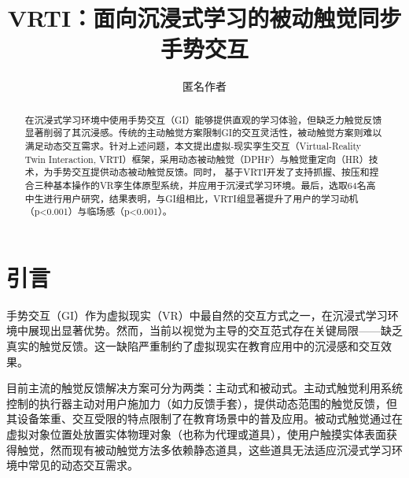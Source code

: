 \documentclass[runningheads]{llncs}
\begin{document}
\title{VRTI：面向沉浸式学习的被动触觉同步手势交互}

 


\author{匿名作者}

\maketitle


\begin{abstract}
在沉浸式学习环境中使用手势交互（GI）能够提供直观的学习体验，但缺乏力触觉反馈显著削弱了其沉浸感。传统的主动触觉方案限制GI的交互灵活性，被动触觉方案则难以满足动态交互需求。针对上述问题，本文提出虚拟-现实孪生交互（Virtual-Reality Twin Interaction, VRTI）框架，采用动态被动触觉（DPHF）与触觉重定向（HR）技术，为手势交互提供动态被动触觉反馈。同时，
基于VRTI开发了支持抓握、按压和捏合三种基本操作的VR孪生体原型系统，并应用于沉浸式学习环境。最后，选取64名高中生进行用户研究，结果表明，与GI组相比，VRTI组显著提升了用户的学习动机（p<0.001）与临场感（p<0.001）。

\end{abstract}

\section{引言}
手势交互（GI）作为虚拟现实（VR）中最自然的交互方式之一，在沉浸式学习环境中展现出显著优势\cite{fang2024interactive,amaral2024interactive}。然而，当前以视觉为主导的交互范式存在关键局限——缺乏真实的触觉反馈。这一缺陷严重制约了虚拟现实在教育应用中的沉浸感和交互效果。

目前主流的触觉反馈解决方案可分为两类：主动式和被动式。主动式触觉利用系统控制的执行器主动对用户施加力（如力反馈手套），提供动态范围的触觉反馈，但其设备笨重、交互受限的特点限制了在教育场景中的普及应用\cite{bonfert2023challenges,shigeyama2019transcalibur}。被动式触觉通过在虚拟对象位置处放置实体物理对象（也称为代理或道具），使用户触摸实体表面获得触觉\cite{hinckley1994passive}，然而现有被动触觉方法多依赖静态道具\cite{strandholt2020knock,fang2023vr,rettinger2023touching}，这些道具无法适应沉浸式学习环境中常见的动态交互需求。
\end{document}
